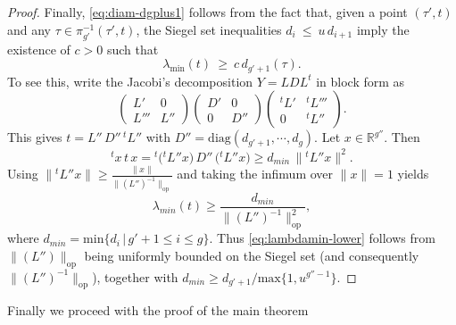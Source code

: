 \documentclass[11pt]{amsart}
\theoremstyle{plain}
\theoremstyle{definition}
\theoremstyle{remark}
\newcommand{\R}{\mathbb R}
\begin{document}
\begin{proof}
Finally, \eqref{eq:diam-dgplus1} follows from the fact that, given a point $(\tau',t)$ and any $\tau\in \pi^{-1}_{g'}(\tau',t)$, the Siegel set inequalities $d_{i}~\leq~ u \,d_{i+1}$ imply the existence of $c>0$ such that
\begin{equation}\label{eq:lambdamin-lower}
    \lambda_{\min}(t)\ \ge\ c\, d_{g'+1}(\tau).
\end{equation}
To see this, write the Jacobi's decomposition $Y=LDL^t$ in block form as
\begin{equation}
       \begin{pmatrix}
            L'&0\\
            L'''&L''
        \end{pmatrix}
        \begin{pmatrix}
            D'&0\\
            0&D''
        \end{pmatrix}
        \begin{pmatrix}
            ^tL'&^tL'''\\
            0&^tL''
        \end{pmatrix}.
\end{equation}
This gives $t=L''\,D''\,{}^tL''$ with $D''=\mathrm{diag}(d_{g'+1},\cdots,d_{g})$. Let $x \in \R^{g''}$. Then
\[
{}^tx\, t\, x = {}^t\bigl({}^tL'' x\bigr)\,D''\,\bigl({}^tL'' x\bigr) \ge d_{min}\,\|{}^tL'' x\|^2.
\]
Using $\|{}^tL'' x\|\ge \frac{\|x\|}{\|(L'')^{-1}\|_{\mathrm{op}}}$ and taking the infimum over $\|x\|=1$ yields
\[
\lambda_{min}(t) \ge \frac{d_{min}}{\|(L'')^{-1}\|_{\mathrm{op}}^2},
\]
where $d_{min}=\mathrm{min}\{d_i\,|\, g'+1\leq i \leq g \}$. Thus \eqref{eq:lambdamin-lower} follows from $\|(L'')\|_{\mathrm{op}}$ being uniformly bounded on the Siegel set (and consequently $\|(L'')^{-1}\|_{\mathrm{op}}$), together with $d_{min} \geq d_{g'+1}/\mathrm{max}\{1,u^{g''-1}\}$.
\end{proof}

Finally we proceed with the proof of the main theorem
\end{document}
